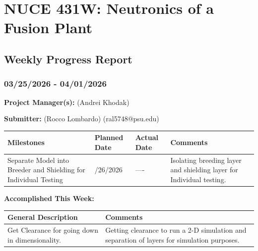 \documentclass{article}
\begin{document}
{\centering \section*{NUCE 431W: Neutronics of a Fusion Plant}

\subsection*{Weekly Progress Report}

\subsubsection*{03/25/2026 - 04/01/2026}}


\hrulefill

\bigskip

\textbf{Project Manager(s):} (Andrei Khodak) 

\bigskip

\textbf{Submitter:} (Rocco Lombardo) (ral5748@psu.edu)

\bigskip

\renewcommand{\arraystretch}{1.5}
\begin{table}[H]
    \centering
    \begin{tabularx}{0.95\textwidth} { 
        | >{\centering\arraybackslash}X 
        | >{\centering\arraybackslash}X 
        | >{\centering\arraybackslash}X
        | >{\centering\arraybackslash}X | }

    \hline
    \textbf{Milestones} & \textbf{Planned Date} & \textbf{Actual Date} & \textbf{Comments} \\
    \hline
    Separate Model into Breeder and Shielding for Individual Testing  & 03/26/2026  & ---- & Isolating breeding layer and shielding layer for Individual testing.    \\
    \hline
    \end{tabularx}
\end{table}

\bigskip

\textbf{Accomplished This Week: }

\renewcommand{\arraystretch}{1.5}
\begin{table}[H]
    \centering
    \begin{tabularx}{0.95\textwidth} { 
        | >{\centering\arraybackslash}X
        | >{\centering\arraybackslash}X | }

    \hline
    \textbf{General Description} & \textbf{Comments} \\
    \hline
    Get Clearance for going down in dimensionality.  & Getting clearance to run a 2-D simulation and separation of layers for simulation purposes. \\
    \hline
    \end{tabularx}
\end{table}
\end{document}
